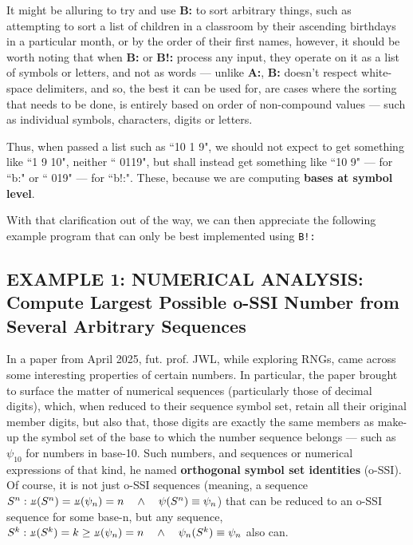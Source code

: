 \documentclass[a4paper, 18pt]{book} %
\newcommand{\invpi}{\rotatebox[origin=c]{180}{$\pi$}}
\begin{document}
It might be alluring to try and use \textbf{B:} to sort arbitrary things, such as attempting to sort a list of children in a classroom by their ascending birthdays in a particular month, or by the order of their first names, however, it should be worth noting that when \textbf{B:} or \textbf{B!:} process any input, they operate on it as a list of symbols or letters, and not as words --- unlike \textbf{A:}, \textbf{B:} doesn't respect white-space delimiters, and so, the best it can be used for, are cases where the sorting that needs to be done, is entirely based on order of non-compound values --- such as individual symbols, characters, digits or letters.

Thus, when passed a list such as ``10 1 9", we should not expect to get something like ``1 9 10", neither `` 0119", but shall instead get something like ``10 9" --- for ``b:" or `` 019" --- for ``b!:". These, because we are computing \textbf{bases at symbol level}.

With that clarification out of the way, we can then appreciate the following example program that can only be best implemented using \texttt{B!:}

\subsection{EXAMPLE 1: \textbf{NUMERICAL ANALYSIS:} Compute Largest Possible o-SSI Number from Several Arbitrary Sequences}
\label{SECEXAMP1B}

In a paper from April 2025, fut. prof. JWL, while exploring RNGs, came across some interesting properties of certain numbers. In particular, the paper \cite{ossipaper} brought to surface the matter of numerical sequences (particularly those of decimal digits), which, when reduced to their sequence symbol set\cite{transformatics}, retain all their original member digits, but also that, those digits are exactly the same members as make-up the symbol set of the base to which the number sequence belongs --- such as $\psi_{10}$ for numbers in base-10. Such numbers, and sequences or numerical expressions of that kind, he named \textbf{orthogonal symbol set identities} (o-SSI). Of course, it is not just o-SSI sequences (meaning, a sequence $S^n: \invpi(S^n) = \invpi(\psi_{n}) = n \quad \land \quad \psi(S^n) \equiv \psi_n$) that can be reduced to an o-SSI sequence for some base-n, but any sequence, $S^k: \invpi(S^k) = k \geq \invpi(\psi_{n}) = n \quad \land \quad \psi_n(S^k) \equiv \psi_n$ also can. 
\end{document}
